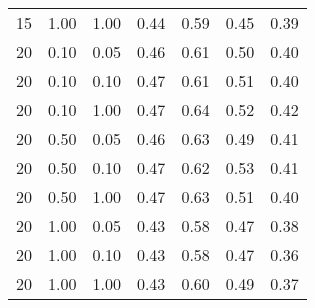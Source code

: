 \begin{tabular}{lllcccc}
15 & 1.00 & 1.00 & 0.44 & 0.59 & 0.45 & 0.39 \\ 
20 & 0.10 & 0.05 & 0.46 & 0.61 & 0.50 & 0.40 \\ 
20 & 0.10 & 0.10 & 0.47 & 0.61 & 0.51 & 0.40 \\ 
20 & 0.10 & 1.00 & 0.47 & 0.64 & 0.52 & 0.42 \\ 
20 & 0.50 & 0.05 & 0.46 & 0.63 & 0.49 & 0.41 \\ 
20 & 0.50 & 0.10 & 0.47 & 0.62 & 0.53 & 0.41 \\ 
20 & 0.50 & 1.00 & 0.47 & 0.63 & 0.51 & 0.40 \\ 
20 & 1.00 & 0.05 & 0.43 & 0.58 & 0.47 & 0.38 \\ 
20 & 1.00 & 0.10 & 0.43 & 0.58 & 0.47 & 0.36 \\ 
20 & 1.00 & 1.00 & 0.43 & 0.60 & 0.49 & 0.37 \\ 
\end{tabular} 
